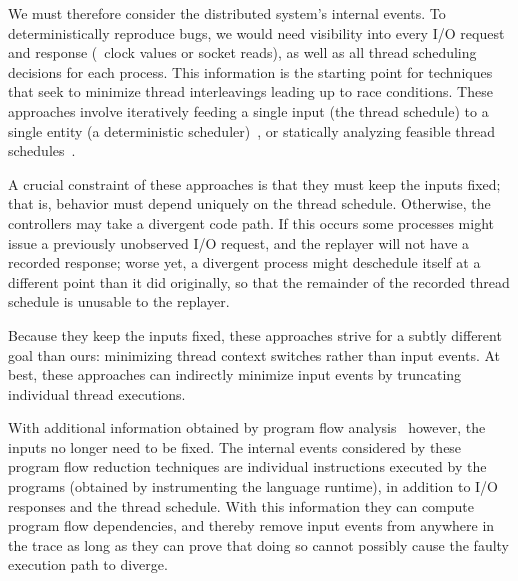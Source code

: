 We must therefore consider the distributed system's internal events. To deterministically
reproduce bugs, we would need visibility into every I/O request and response (\eg~clock
values or socket reads), as well as all thread scheduling
decisions for each process. This information is the starting point for
techniques that seek  to minimize thread interleavings leading up to race conditions.
These approaches involve iteratively feeding a single input (the thread
schedule) to a single entity (a deterministic scheduler)~\cite{choi2002isolating,claessen2009finding,jalbert2010trace}, or
statically analyzing feasible thread schedules~\cite{huang2011efficient}.

A crucial constraint of these approaches is that they must keep the inputs
fixed; that is, behavior must depend uniquely on the thread
schedule. Otherwise, the controllers may take a divergent code path. If this
occurs some processes might issue a previously unobserved I/O request, and the replayer will not
have a recorded response; worse yet, a divergent process might deschedule
itself at a different point than it did originally, so that the remainder of
the recorded thread schedule is unusable to the replayer.

Because they keep the inputs fixed, these approaches strive for a
subtly different goal than
ours: minimizing thread context switches rather than input events.
At best, these approaches can indirectly minimize input events by truncating
individual thread executions. %


With additional information obtained by program flow
analysis~\cite{Lee:2011:TGR:1993498.1993528,tallam2007enabling,huang2012lean}
however, the inputs no longer need to be fixed. The internal events considered by these program flow reduction
techniques are individual instructions executed by the
programs (obtained by instrumenting the language runtime), in addition to I/O responses and the thread schedule.
With this information they can compute
program flow dependencies, and thereby remove input events from anywhere in the trace as long as they
can prove that doing so cannot possibly cause the faulty execution path to diverge.

